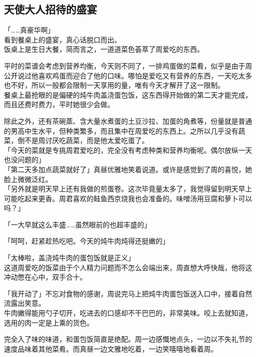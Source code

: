 \subsection{天使大人招待的盛宴}

「……真豪华啊」\\

看到餐桌上的盛宴，真心话脱口而出。\\

饭桌上是生日大餐，简而言之，一道道菜色荟萃了周爱吃的东西。

平时的菜谱会考虑到营养均衡，今天则不同了，一排鸡蛋做的菜肴，似乎是由于周公开说过他喜欢鸡蛋而迎合了他的口味。哪怕是爱吃又有营养的东西，一天吃太多也不好，所以一般都会限制一天享用的量，唯有今天才解开了这一限制。\\

餐桌上最抢眼的是偏硬的炖牛肉盖浇蛋包饭，这东西得开始做的第二天才能完成，而且还费时费力，平时她很少会做。

除此之外，还有茶碗蒸、含大量水煮蛋的土豆沙拉、加蛋的角煮等，份量就是普通的男高中生水平，但种类繁多，而且集中在周爱吃的东西上。之所以几乎没有蔬菜，倒不是周讨厌吃蔬菜，而是他太爱吃蛋了。\\

「今天的菜就是专挑周君爱吃的，完全没有考虑种类和营养均衡呢。偶尔放纵一天也没问题的」\\

「第二天多加点蔬菜就好了」真昼优雅地笑着说道。或许是感觉到了周的喜悦，她脸上微微泛红。\\

「另外就是明天早上还有我做的煎蛋卷。这次毕竟量太多了，我觉得留到明天早上可能吃起来更香。周君喜欢的鲑鱼西京烧我也会准备的。味噌汤用豆腐和萝卜可以吗？」

「一大早就这么丰盛……虽然眼前的也超丰盛的」

「呵呵，赶紧趁热吃吧。今天的炖牛肉炖得还挺嫩的」

「太棒啦，盖浇炖牛肉的蛋包饭就是正义」\\

这道周爱吃的饭菜由于个人精力问题而不怎么会端出来，周直想大呼快哉，他将这冲动憋在心中，双手合十。

「我开动了」不忘对食物的感谢，周说完马上把炖牛肉蛋包饭送入口中，接着自然流露出笑意。\\

牛肉嫩得能用勺子切开，吃进去的口感却不干巴巴的，非常美味。咬上去就知道，选用的肉一定是上乘的货色。

完全入了味的味道，和蛋包饭简直是绝配。周一边感慨地点头，一边以不失礼节的速度品味着其他菜肴。而真昼一边文雅地吃着，一边笑嘻嘻地看着周。\\

